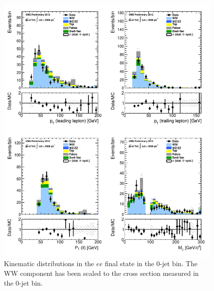 \begin{figure}[!hbtp]
\centering
\includegraphics[width=1\textwidth]{figures/ww_analysis20_0_ALL_ee_0j.pdf} %
\caption{Kinematic distributions in the $ee$ final state in the 0-jet bin.
The WW component has been scaled to the cross section measured in the 0-jet bin.}
\label{fig:xs_kinematics_ee_0j}
\end{figure}
